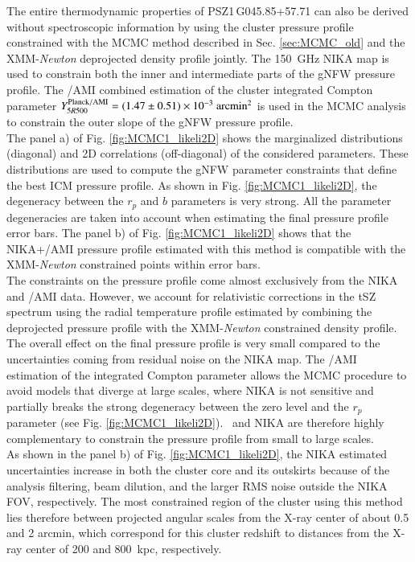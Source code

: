 \documentclass[traditabstract]{aa}
\begin{document}
The entire thermodynamic properties of \mbox{PSZ1\,G045.85+57.71} can also be derived without spectroscopic information by using the cluster pressure profile constrained with the MCMC method described in Sec. \ref{sec:MCMC_old} and the XMM-{\it Newton} deprojected density profile  jointly. The 150~GHz NIKA map is used to constrain both the inner and intermediate parts of the gNFW pressure profile. The \planck/AMI combined estimation of the cluster integrated Compton parameter \mbox{$Y_{5R500}^{\rm{Planck/AMI}} = (1.47 \pm  0.51) \times 10^{-3}~\mathrm{arcmin^2}$} is used in the MCMC analysis to constrain the outer slope of the gNFW pressure profile.\\
\indent The panel a) of Fig. \ref{fig:MCMC1_likeli2D} shows the marginalized distributions (diagonal) and 2D correlations (off-diagonal) of the considered parameters. These distributions are used to compute the gNFW parameter constraints that define the best ICM pressure profile. As shown in Fig. \ref{fig:MCMC1_likeli2D}, the degeneracy between the $r_p$ and $b$ parameters is very strong. All the parameter degeneracies are taken into account when estimating the final pressure profile error bars. The panel b) of Fig. \ref{fig:MCMC1_likeli2D} shows that the NIKA+\planck/AMI pressure profile estimated with this method is compatible with the XMM-{\it Newton} constrained points within error bars.\\
\indent The constraints on the pressure profile come almost exclusively from the NIKA and \planck/AMI data. However, we account for relativistic corrections in the tSZ spectrum using the radial temperature profile estimated by combining the deprojected pressure profile with the XMM-{\it Newton} constrained density profile. The overall effect on the final pressure profile is very small compared to the uncertainties coming from residual noise on the NIKA map. The \planck/AMI estimation of the integrated Compton parameter allows the MCMC procedure to avoid models that diverge at large scales, where NIKA is not sensitive and partially breaks the strong degeneracy between the zero level and the $r_p$ parameter (see Fig. \ref{fig:MCMC1_likeli2D}). \planck\ and NIKA are therefore highly complementary to constrain the pressure profile from small to large scales.\\
\indent As shown in the panel b) of Fig. \ref{fig:MCMC1_likeli2D}, the NIKA estimated uncertainties increase in both the cluster core and its outskirts because of the analysis filtering, beam dilution, and the larger RMS noise outside the NIKA FOV, respectively. The most constrained region of the cluster using this method lies therefore between projected angular scales from the X-ray center of about 0.5 and 2 arcmin, which correspond for this cluster redshift to distances from the X-ray center of 200 and 800~kpc, respectively.\\
\indent 
\end{document}
